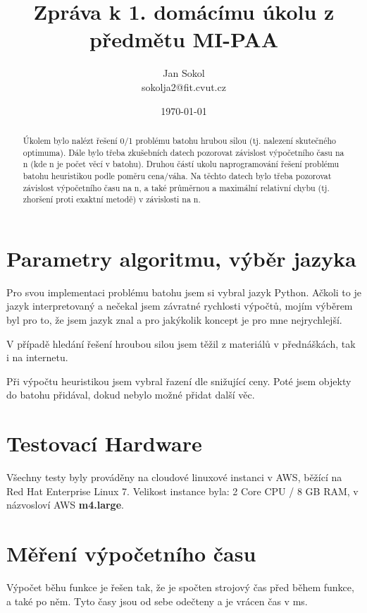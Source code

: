 \documentclass[a4paper,10pt,twocolumn]{article}
\title{Zpráva k 1. domácímu úkolu z předmětu MI-PAA}
\date{\today}
\author{Jan Sokol \\ sokolja2@fit.cvut.cz}
\begin{document}
\maketitle
\begin{abstract}
Úkolem bylo nalézt řešení 0/1 problému batohu hrubou silou (tj. nalezení skutečného optimuma). Dále bylo třeba zkušebních datech pozorovat závislost výpočetního času na n (kde n je počet věcí v batohu). Druhou částí ukolu naprogramování řešení problému batohu heuristikou podle poměru cena/váha. Na těchto datech bylo třeba pozorovat závislost výpočetního času na n, a také průměrnou a maximální relativní chybu (tj. zhoršení proti exaktní metodě) v závislosti na n.
\end{abstract}

\section{Parametry algoritmu, výběr jazyka}
Pro svou implementaci problému batohu jsem si vybral jazyk Python. Ačkoli to je jazyk interpretovaný a nečekal jsem závratné rychlosti výpočtů, mojím výběrem byl pro to, že jsem jazyk znal a pro jakýkolik koncept je pro mne nejrychlejší.

V případě hledání řešení hroubou silou jsem těžil z materiálů v přednáškách, tak i na internetu.

Při výpočtu heuristikou jsem vybral řazení dle snižující ceny. Poté jsem objekty do batohu přidával, dokud nebylo možné přidat další věc.


\section{Testovací Hardware}
Všechny testy byly prováděny na cloudové linuxové instanci v AWS, běžící na Red Hat Enterprise Linux 7. Velikost instance byla:
  2 Core CPU / 8 GB RAM, v názvosloví AWS \textbf{m4.large}.


\section{Měření výpočetního času}
Výpočet běhu funkce je řešen tak, že je spočten strojový čas před během funkce, a také po něm. Tyto časy jsou od sebe odečteny a je vrácen čas v ms.
\end{document}
